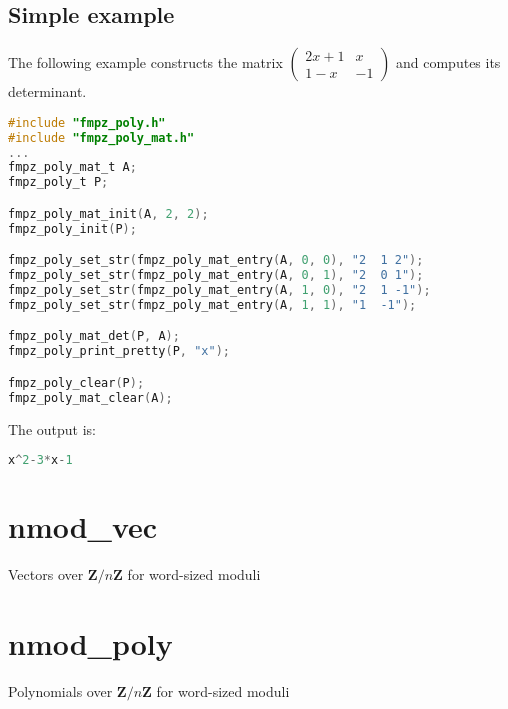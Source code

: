 \documentclass[a4paper,10pt]{book}
\newcommand{\Z}{\mathbf{Z}}%
\begin{document}
\section{Simple example}

The following example constructs the matrix
$\begin{pmatrix} 2x+1 & x \\ 1-x & -1 \end{pmatrix}$ and computes
its determinant.

\begin{lstlisting}[language=c]
#include "fmpz_poly.h"
#include "fmpz_poly_mat.h"
...
fmpz_poly_mat_t A;
fmpz_poly_t P;

fmpz_poly_mat_init(A, 2, 2);
fmpz_poly_init(P);

fmpz_poly_set_str(fmpz_poly_mat_entry(A, 0, 0), "2  1 2");
fmpz_poly_set_str(fmpz_poly_mat_entry(A, 0, 1), "2  0 1");
fmpz_poly_set_str(fmpz_poly_mat_entry(A, 1, 0), "2  1 -1");
fmpz_poly_set_str(fmpz_poly_mat_entry(A, 1, 1), "1  -1");

fmpz_poly_mat_det(P, A);
fmpz_poly_print_pretty(P, "x");

fmpz_poly_clear(P);
fmpz_poly_mat_clear(A);
\end{lstlisting}

The output is:
\begin{lstlisting}[language=c]
x^2-3*x-1
\end{lstlisting}




\chapter{nmod\_vec}
\epigraph{Vectors over $\Z / n \Z$ for word-sized moduli}{}




\chapter{nmod\_poly}
\epigraph{Polynomials over $\Z / n \Z$ for word-sized moduli}{}
\end{document}
